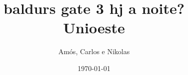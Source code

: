 \documentclass[11pt, a4paper, twoside]{article}
\title{baldurs gate 3 hj a noite? \\ Unioeste}
\author{Amós, Carlos e Nikolas}
\begin{document}
\twocolumn
\date{\today}
\maketitle


\renewcommand{\contentsname}{Índice} %
\tableofcontents
\end{document}
